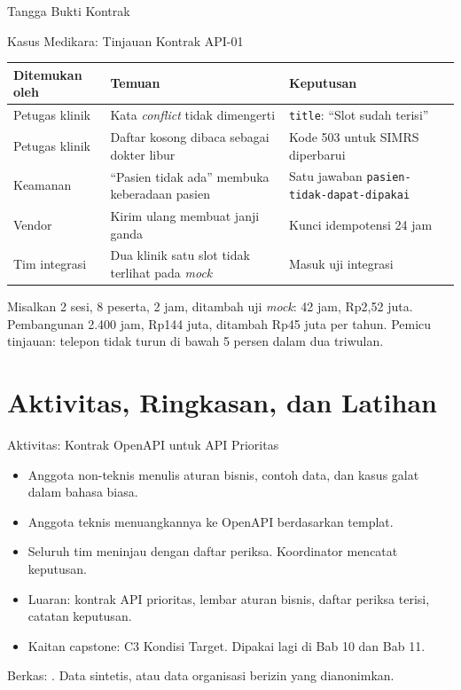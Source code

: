 \documentclass[aspectratio=169, table, 12pt]{beamer}
\begin{document}
\begin{frame}{{\Large Tangga Bukti Kontrak}}
  \centering
\end{frame}

\begin{frame}{{\Large Kasus Medikara: Tinjauan Kontrak API-01}}
  \scriptsize
  \begin{tabularx}{\textwidth}{>{\raggedright\arraybackslash}p{2.1cm} >{\raggedright\arraybackslash}X >{\raggedright\arraybackslash}X}
    \hline
    \textbf{Ditemukan oleh} & \textbf{Temuan} & \textbf{Keputusan} \\ \hline
    Petugas klinik & Kata \textit{conflict} tidak dimengerti & \texttt{title}: ``Slot sudah terisi'' \\ \hline
    Petugas klinik & Daftar kosong dibaca sebagai dokter libur & Kode 503 untuk SIMRS diperbarui \\ \hline
    Keamanan & ``Pasien tidak ada'' membuka keberadaan pasien & Satu jawaban \texttt{pasien-tidak-dapat-dipakai} \\ \hline
    Vendor & Kirim ulang membuat janji ganda & Kunci idempotensi 24 jam \\ \hline
    Tim integrasi & Dua klinik satu slot tidak terlihat pada \textit{mock} & Masuk uji integrasi \\ \hline
  \end{tabularx}

  \vspace{8pt}
  \small Misalkan 2 sesi, 8 peserta, 2 jam, ditambah uji \textit{mock}: 42 jam, Rp2,52 juta. Pembangunan 2.400 jam, Rp144 juta, ditambah Rp45 juta per tahun. Pemicu tinjauan: telepon tidak turun di bawah 5 persen dalam dua triwulan.
\end{frame}

\section{Aktivitas, Ringkasan, dan Latihan}

\begin{frame}{{\Large Aktivitas: Kontrak OpenAPI untuk API Prioritas}}
  \small
  \begin{itemize}
    \item Anggota non-teknis menulis aturan bisnis, contoh data, dan kasus galat dalam bahasa biasa.
    \item Anggota teknis menuangkannya ke OpenAPI berdasarkan templat.
    \item Seluruh tim meninjau dengan daftar periksa. Koordinator mencatat keputusan.
    \item Luaran: kontrak API prioritas, lembar aturan bisnis, daftar periksa terisi, catatan keputusan.
    \item Kaitan capstone: C3 Kondisi Target. Dipakai lagi di Bab 10 dan Bab 11.
  \end{itemize}
  \vspace{4pt}
  {\footnotesize Berkas: . Data sintetis, atau data organisasi berizin yang dianonimkan.\par}
\end{frame}
\end{document}
